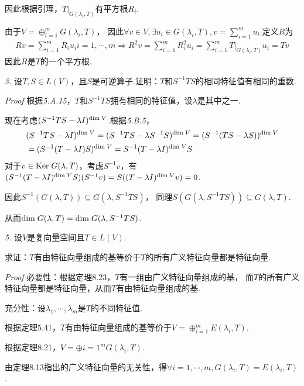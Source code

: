 因此根据引理，\(T|_{G(\lambda_i,T)}\)有平方根\(R_i\).

由于\(V=\oplus_{i=1}^m G(\lambda_i,T)\)，
因此\(\forall v \in V,\exists u_i \in G(\lambda_i,T),v=\sum_{i=1}^m u_i\).定义\(R\)为
    \begin{align*}
        Rv=\sum_{i=1}^m R_iu_i i=1,\cdots,m \Rightarrow
        R^2v=\sum_{i=1}^m R_i^2 u_i=\sum_{i=1}^m T|_{G(\lambda_i,T)}u_i=Tv
    \end{align*}
因此\(R\)是\(T\)的一个平方根.

\newpage

\textit{3.}
设\(T,S \in L(V)\)，且\(S\)是可逆算子.证明：\(T\)和\(S^{-1}TS\)的相同特征值有相同的重数.

\textit{Proof}
根据\textit{5.A.15}，\(T\)和\(S^{-1}TS\)拥有相同的特征值，设\(\lambda\)是其中之一.

现在考虑\((S^{-1}TS-\lambda I)^{\mathrm{dim \;} V}\).根据\textit{5.B.5}，
    \begin{align*}
        &(S^{-1}TS-\lambda I)^{\mathrm{dim \;} V}=(S^{-1}TS-\lambda S^{-1}S)^{\mathrm{dim \;} V}=(S^{-1}(TS-\lambda S))^{\mathrm{dim \;} V} \\
        &=(S^{-1}(T-\lambda I)S)^{\mathrm{dim \;} V}=S^{-1}(T-\lambda I)^{\mathrm{dim \;} V}S
    \end{align*}
对于\(v \in \mathrm{Ker \;} G(\lambda,T)\)，考虑\(S^{-1}v\)，有
\((S^{-1}(T-\lambda I)^{\mathrm{dim \;} V}S)(S^{-1}v)=S((T-\lambda I)^{\mathrm{dim \;} V}v)=0\).

因此\(S^{-1}(G(\lambda,T)) \subseteq G(\lambda,S^{-1}TS)\)，
同理\(S(G(\lambda,S^{-1}TS)) \subseteq G(\lambda,T)\).

从而\(\mathrm{dim \;} G(\lambda,T)=\mathrm{dim \;} G(\lambda,S^{-1}TS)\).

\hspace*{\fill}

\textit{5.}
设\(V\)是复向量空间且\(T \in L(V)\).

求证：\(T\)有由特征向量组成的基等价于\(T\)的所有广义特征向量都是特征向量.

\textit{Proof}
必要性：根据定理8.23，\(T\)有一组由广义特征向量组成的基，
而\(T\)的所有广义特征向量都是特征向量，从而\(T\)有由特征向量组成的基.

充分性：设\(\lambda_1,\cdots,\lambda_m\)是\(T\)的不同特征值.

根据定理5.41，\(T\)有由特征向量组成的基等价于\(V=\oplus_{i=1}^m E(\lambda_i,T)\).

根据定理8.21，\(V=\oplus{i=1}^m G(\lambda_i,T)\).

由定理8.13指出的广义特征向量的无关性，得\(\forall i=1,\cdots,m,G(\lambda_i,T)=E(\lambda_i,T)\).

